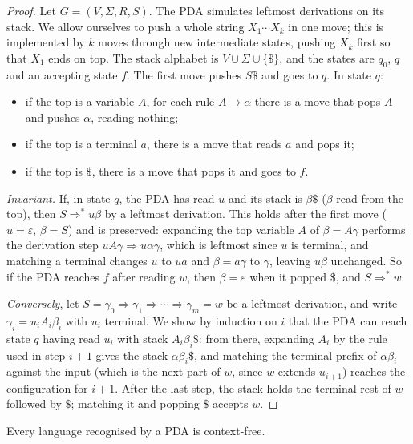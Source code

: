 \begin{proof}
Let $G=(V,\Sigma,R,S)$. The PDA simulates leftmost derivations on its stack. We allow ourselves to push a whole string $X_1\cdots X_k$ in one move; this is implemented by $k$ moves through new intermediate states, pushing $X_k$ first so that $X_1$ ends on top. The stack alphabet is $V\cup\Sigma\cup\{\$\}$, and the states are $q_0$, $q$ and an accepting state $f$. The first move pushes $S\$$ and goes to $q$. In state $q$:
\begin{itemize}
\item if the top is a variable $A$, for each rule $A\to\alpha$ there is a move that pops $A$ and pushes $\alpha$, reading nothing;
\item if the top is a terminal $a$, there is a move that reads $a$ and pops it;
\item if the top is $\$$, there is a move that pops it and goes to $f$.
\end{itemize}
\emph{Invariant.} If, in state $q$, the PDA has read $u$ and its stack is $\beta\$$ ($\beta$ read from the top), then $S\Rightarrow^*u\beta$ by a leftmost derivation. This holds after the first move ($u=\varepsilon$, $\beta=S$) and is preserved: expanding the top variable $A$ of $\beta=A\gamma$ performs the derivation step $uA\gamma\Rightarrow u\alpha\gamma$, which is leftmost since $u$ is terminal, and matching a terminal changes $u$ to $ua$ and $\beta=a\gamma$ to $\gamma$, leaving $u\beta$ unchanged. So if the PDA reaches $f$ after reading $w$, then $\beta=\varepsilon$ when it popped $\$$, and $S\Rightarrow^*w$.

\emph{Conversely}, let $S=\gamma_0\Rightarrow\gamma_1\Rightarrow\cdots\Rightarrow\gamma_m=w$ be a leftmost derivation, and write $\gamma_i=u_iA_i\beta_i$ with $u_i$ terminal. We show by induction on $i$ that the PDA can reach state $q$ having read $u_i$ with stack $A_i\beta_i\$$: from there, expanding $A_i$ by the rule used in step $i+1$ gives the stack $\alpha\beta_i\$$, and matching the terminal prefix of $\alpha\beta_i$ against the input (which is the next part of $w$, since $w$ extends $u_{i+1}$) reaches the configuration for $i+1$. After the last step, the stack holds the terminal rest of $w$ followed by $\$$; matching it and popping $\$$ accepts $w$.
\end{proof}

\begin{theorem}\label{thm:pdatocfg}
Every language recognised by a PDA is context-free.
\end{theorem}

